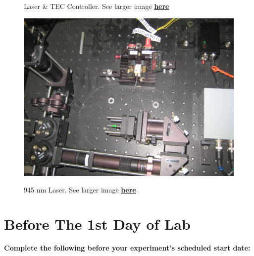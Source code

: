 \documentclass{../lab}
\begin{document}
\begin{figure}[h]
\begin{minipage}{0.32\textwidth}
    \caption{Laser \& TEC Controller. See larger image \href{http://experimentationlab.berkeley.edu/sites/default/files/images/OTZ_Laser_Controller_3553.jpg}{\textbf{here}}}
\end{minipage}
\begin{minipage}{0.32\textwidth}
    \href{http://experimentationlab.berkeley.edu/sites/default/files/images/OTZ_Laser_3550.jpg}{\includegraphics[width=\linewidth,keepaspectratio]{images/OTZ_Laser_3550.jpg}}
    \caption{945 nm Laser. See larger image \href{http://experimentationlab.berkeley.edu/sites/default/files/images/OTZ_Laser_3550.jpg}{\textbf{here}}}
\end{minipage}
\end{figure}

\section{Before The 1st Day of Lab}

\textbf{Complete the following before your experiment's scheduled start date:}
\end{document}
